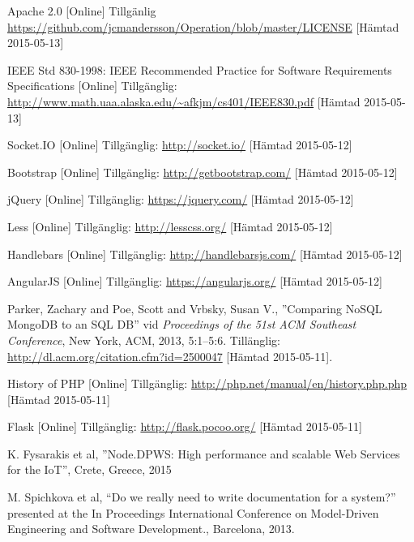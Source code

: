 \vspace{-15mm}
\renewcommand{\refname}{}
\begin{thebibliography}{9}


Apache 2.0 [Online] Tillgänlig \url{https://github.com/jcmandersson/Operation/blob/master/LICENSE} [Hämtad 2015-05-13]

IEEE Std 830-1998: IEEE Recommended Practice for Software Requirements Specifications [Online] Tillgänglig:
\url{http://www.math.uaa.alaska.edu/~afkjm/cs401/IEEE830.pdf} [Hämtad 2015-05-13]

Socket.IO [Online] Tillgänglig: 
\url{http://socket.io/} [Hämtad 2015-05-12]

Bootstrap [Online] Tillgänglig: 
\url{http://getbootstrap.com/} [Hämtad 2015-05-12]

jQuery [Online] Tillgänglig: 
\url{https://jquery.com/} [Hämtad 2015-05-12]

Less [Online] Tillgänglig: 
\url{http://lesscss.org/} [Hämtad 2015-05-12]

Handlebars [Online] Tillgänglig: 
\url{http://handlebarsjs.com/} [Hämtad 2015-05-12]

AngularJS [Online] Tillgänglig: 
\url{https://angularjs.org/} [Hämtad 2015-05-12]

 Parker, Zachary and Poe, Scott and Vrbsky, Susan V., ''Comparing NoSQL MongoDB to an SQL DB'' vid \textit{Proceedings of the 51st ACM Southeast Conference}, New York, ACM, 2013, 5:1--5:6. Tillänglig: \url{http://dl.acm.org/citation.cfm?id=2500047} [Hämtad 2015-05-11].

History of PHP [Online] Tillgänglig:
\url{http://php.net/manual/en/history.php.php}
[Hämtad 2015-05-11]
	
Flask [Online] Tillgänglig:
\url{http://flask.pocoo.org/}
[Hämtad 2015-05-11]
	
K. Fysarakis et al, ''Node.DPWS: High performance and scalable Web Services for the IoT'', Crete, Greece, 2015


M. Spichkova et al, “Do we really need to write documentation for a system?” presented at the In Proceedings International Conference on Model-Driven Engineering and Software Development., Barcelona, 2013.


\end{thebibliography}
